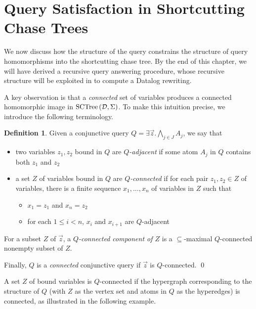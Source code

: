 \documentclass[12pt]{report}
\theoremstyle{plain}
\theoremstyle{definition}
\newtheorem{definition}[theorem]{Definition}
\newcommand{\SCTree}[2]{\ensuremath{\normalfont{\textrm{SCTree}} \left( #1, #2 \right)}}
\begin{document}

\section{Query Satisfaction in Shortcutting Chase Trees}

We now discuss how the structure of the query constrains the structure of query homomorphisms into the shortcutting chase tree. By the end of this chapter, we will have derived a recursive query answering procedure, whose recursive structure will be exploited in  to compute a Datalog rewriting.

A key observation is that a \emph{connected} set of variables produces a connected homomorphic image in $\SCTree{\mathcal{D}}{\Sigma}$. To make this intuition precise, we introduce the following terminology.

\begin{definition}
  Given a conjunctive query $Q = \exists \vec{z}. \bigwedge_{j \in J} A_j$, we say that
  \begin{itemize}
    \item two variables $z_1, z_2$ bound in $Q$ are \emph{$Q$-adjacent} if some atom $A_j$ in $Q$ contains both $z_1$ and $z_2$
    \item a set $Z$ of variables bound in $Q$ are \emph{$Q$-connected} if for each pair $z_1, z_2 \in Z$ of variables, there is a finite sequence $x_1, \ldots, x_n$ of variables in $Z$ such that
    \begin{itemize}
      \item $x_1 = z_1$ and $x_n = z_2$
      \item for each $1 \leq i < n$, $x_i$ and $x_{i+1}$ are $Q$-adjacent
    \end{itemize}
  \end{itemize}

  For a subset $Z$ of $\vec{z}$, a \emph{$Q$-connected component of $Z$} is a $\subseteq$-maximal $Q$-connected nonempty subset of $Z$.

  Finally, $Q$ is a \emph{connected} conjunctive query if $\vec{z}$ is $Q$-connected.
  \qed
\end{definition}

A set $Z$ of bound variables is $Q$-connected if the hypergraph corresponding to the structure of $Q$ (with $Z$ as the vertex set and atoms in $Q$ as the hyperedges) is connected, as illustrated in the following example.
\end{document}
